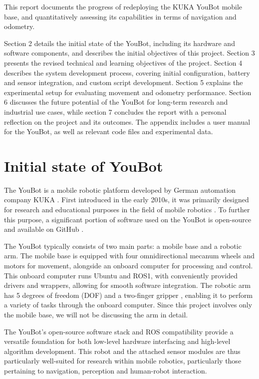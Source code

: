 \documentclass[a4paper, 12pt]{article}
\begin{document}
    This report documents the progress of redeploying the KUKA YouBot mobile base, and quantitatively assessing its capabilities in terms of navigation and odometry. 

    Section 2 details the initial state of the YouBot, including its hardware and software components, and describes the initial objectives of this project. Section 3 presents the revised technical and learning objectives of the project. Section 4 describes the system development process, covering initial configuration, battery and sensor integration, and custom script development. Section 5 explains the experimental setup for evaluating movement and odometry performance. Section 6 discusses the future potential of the YouBot for long-term research and industrial use cases, while section 7 concludes the report with a personal reflection on the project and its outcomes. The appendix includes a user manual for the YouBot, as well as relevant code files and experimental data.
    
    \pagebreak

    \section{Initial state of YouBot}

    The YouBot is a mobile robotic platform developed by German automation company KUKA \cite{KUKAYouBotFlyer}. First introduced in the early 2010s, it was primarily designed for research and educational purposes in the field of mobile robotics \cite{KUKAYouBotManual2013}. To further this purpose, a significant portion of software used on the YouBot is open-source and available on GitHub \cite{KUKAYouBotManual2013,githubYoubotOverview}.

    The YouBot typically consists of two main parts: a mobile base and a robotic arm. The mobile base is equipped with four omnidirectional mecanum wheels and motors for movement, alongside an onboard computer for processing and control. This onboard computer runs Ubuntu and ROS1, with conveniently provided drivers and wrappers, allowing for smooth software integration. The robotic arm has 5 degrees of freedom (DOF) and a two-finger gripper \cite{KUKAYouBotManual2013}, enabling it to perform a variety of tasks through the onboard computer. Since this project involves only the mobile base, we will not be discussing the arm in detail.

    The YouBot's open-source software stack and ROS compatibility provide a versatile foundation for both low-level hardware interfacing and high-level algorithm development. This robot and the attached sensor modules are thus particularly well-suited for research within mobile robotics, particularly those pertaining to navigation, perception and human-robot interaction. 
\end{document}
